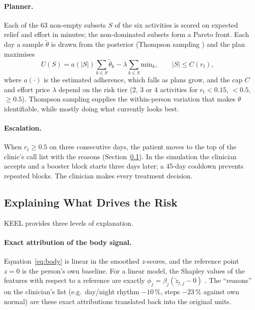 \documentclass[11pt,a4paper]{article}
\begin{document}
\paragraph{Planner.} Each of the 63 non-empty subsets $S$ of the six activities is scored on expected relief and effort in minutes; the non-dominated subsets form a Pareto front. Each day a sample $\tilde\theta$ is drawn from the posterior (Thompson sampling \cite{russo2018}) and the plan maximises
\begin{equation}
U(S) = a(|S|)\sum_{k\in S}\tilde\theta_k - \lambda \sum_{k\in S}\text{min}_k, \qquad |S| \leq C(r_t),
\end{equation}
where $a(\cdot)$ is the estimated adherence, which falls as plans grow, and the cap $C$ and effort price $\lambda$ depend on the risk tier (2, 3 or 4 activities for $r_t < 0.15$, $< 0.5$, $\geq 0.5$). Thompson sampling supplies the within-person variation that makes $\theta$ identifiable, while mostly doing what currently looks best.

\paragraph{Escalation.} When $r_t \geq 0.5$ on three consecutive days, the patient moves to the top of the clinic's call list with the reasons (Section~\ref{sec:xai}). In the simulation the clinician accepts and a booster block starts three days later; a 45-day cooldown prevents repeated blocks. The clinician makes every treatment decision.

\subsection{Explaining What Drives the Risk}
\label{sec:xai}

KEEL provides three levels of explanation.

\paragraph{Exact attribution of the body signal.} Equation~\eqref{eq:body} is linear in the smoothed $z$-scores, and the reference point $z=0$ is the person's own baseline. For a linear model, the Shapley values of the features with respect to a reference are exactly $\phi_j = \beta_j(\tilde z_{t,j} - 0)$ \cite{lundberg2017}. The ``reasons'' on the clinician's list (e.g.\ day/night rhythm $-10$\,\%, steps $-23$\,\% against own normal) are these exact attributions translated back into the original units.
\end{document}
